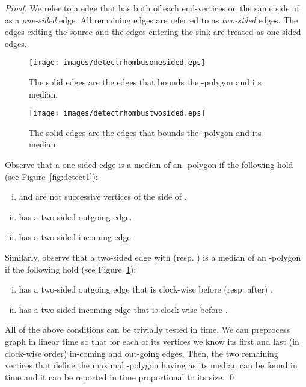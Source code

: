 \documentclass{myllncs-mixalis}
\begin{document}
\begin{proof}


We refer to a edge that has both of each end-vertices on the same
side of  as a \emph{one-sided} edge. All remaining edges are
referred to as \emph{two-sided} edges. The edges exiting the source
and the edges entering the sink are treated as one-sided edges.

\begin{figure}[htb]
    \begin{minipage}{0.45\textwidth}
    \centering
    \texttt{[image: images/detectrhombusonesided.eps]}
    \caption{The solid edges are the edges that bounds the -polygon and its median.}
    \label{fig:detect1}
  \end{minipage}
  \hfill
  \begin{minipage}{0.45\textwidth}
    \centering
    \texttt{[image: images/detectrhombustwosided.eps]}
    \caption{The solid edges are the edges that bounds the -polygon and its median.}
    \label{fig:detect2}
  \end{minipage}
\end{figure}

Observe that a one-sided edge  is a median of an -polygon
if the following hold (see Figure~\ref{fig:detect1}):
\vspace*{-0.4cm}
\begin{enumerate}[(i)]
\item  and  are not successive vertices of the side of .
\item  has a two-sided outgoing edge.
\item  has a two-sided incoming edge.
\end{enumerate}

Similarly, observe that a two-sided edge  with 
(resp.  ) is a median of an -polygon if the following
hold (see Figure~\ref{fig:detect2}): \vspace*{-0.4cm}
\begin{enumerate}[(i)]
\item  has a two-sided outgoing edge that is clock-wise before (resp. after)
 .
\item  has a two-sided incoming edge that is clock-wise before .
\end{enumerate}

All of the above conditions can be trivially tested in  time.
We can preprocess graph  in linear time so that for each of its
vertices  we know its first and last (in clock-wise order) in-coming
and out-going edges, Then, the two remaining vertices that define
the maximal -polygon having  as its median can be found
in  time and it can be reported in time proportional to its
size. \qed
\end{proof}
\end{document}
